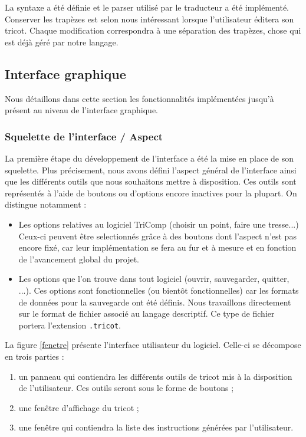 \documentclass{article}
\begin{document}
La syntaxe a été définie et le parser utilisé par le traducteur a été implémenté.
Conserver les trapèzes est selon nous intéressant lorsque l'utilisateur éditera son tricot. Chaque modification correspondra à une séparation des trapèzes, chose qui est déjà géré par notre langage. 


\subsection{Interface graphique}

Nous détaillons dans cette section les fonctionnalités implémentées jusqu'à présent au niveau de l'interface graphique.

\subsubsection{Squelette de l'interface / Aspect}

La première étape du développement de l'interface a été la mise en place de son squelette. Plus précisement, nous avons défini l'aspect
général de l'interface ainsi que les différents outils que nous souhaitons mettre à disposition. Ces outils sont représentés à l'aide de
boutons ou d'options encore inactives pour la plupart. On distingue notamment :
\begin{itemize}
  \item Les options relatives au logiciel TriComp (choisir un point, faire une tresse...) Ceux-ci peuvent être selectionnés grâce à des
boutons dont l'aspect n'est pas encore fixé, car leur implémentation se fera au fur et à mesure et en fonction de l'avancement global du
projet.
  \item Les options que l'on trouve dans tout logiciel (ouvrir, sauvegarder, quitter, ...). Ces options sont fonctionnelles (ou bientôt
fonctionnelles) car les formats de données pour la sauvegarde ont été définis. Nous travaillons directement sur le format de fichier
associé au langage descriptif. Ce type de fichier portera l'extension \texttt{.tricot}.
\end{itemize}
La figure \ref{fenetre} présente l'interface utilisateur du logiciel. Celle-ci se décompose en trois parties : 
\begin{enumerate}
   \item un panneau qui contiendra les différents outils de tricot mis à la disposition de l'utilisateur. Ces outils seront sous le forme de boutons ;
   \item une fenêtre d'affichage du tricot ;
   \item une fenêtre qui contiendra la liste des instructions générées par l'utilisateur.
\end{enumerate}
\end{document}
